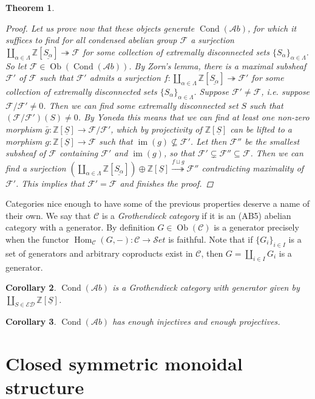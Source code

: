 \documentclass[11pt,A4]{article}
\theoremstyle{plain}
\newtheorem{thm}{Theorem}[section]
\newtheorem{cor}[thm]{Corollary}
\theoremstyle{definition}
\theoremstyle{remark}
\newcommand{\Z}{\mathbb{Z}}
\newcommand{\1}{\mathbbm{1}}
\newcommand{\F}{\mathcal{F}}
\newcommand{\scrC}{\mathscr{C}}
\newcommand{\ED}{\mathscr{ED}}
\newcommand{\Ab}{\mathscr{A}b}
\newcommand{\Set}{\mathscr{S}et}
\DeclareMathOperator{\Hom}{Hom}
\DeclareMathOperator{\Cond}{Cond}
\DeclareMathOperator{\Ob}{Ob}
\DeclareMathOperator{\im}{im}
\renewcommand{\u}[1]{\underline{#1}}
\newcommand{\op}{\oplus}
\begin{document}
\begin{thm}
\begin{proof}
	Let us prove now that these objects generate $\Cond(\Ab)$, for which it suffices to find for all condensed abelian group $\F$ a surjection $\coprod_{\alpha \in \Lambda}\Z[\u{S_{\alpha}}]\twoheadrightarrow \F$ for some collection of extremally disconnected sets $\{S_{\alpha}\}_{\alpha\in \Lambda}$.
	So let $\F\in \Ob(\Cond(\Ab))$.
	By Zorn's lemma, there is a maximal subsheaf $\F'$ of $\F$ such that $\F'$ admits a surjection $f\colon \coprod_{\alpha\in \Lambda}\Z[\u{S_{\alpha}}]\twoheadrightarrow \F'$ for some collection of extremally disconnected sets $\{S_{\alpha}\}_{\alpha\in \Lambda}$.
	Suppose $\F'\neq \F$, i.e. suppose $\F/\F'\neq 0$.
	Then we can find some extremally disconnected set $S$ such that $(\F/\F')(S)\neq 0$.
	By Yoneda this means that we can find at least one non-zero morphism $\bar{g}\colon \Z[\u{S}]\to \F/\F'$, which by projectivity of $\Z[\u{S}]$ can be lifted to a morphism $g\colon \Z[\u{S}]\to \F$ such that $\im(g)\not\subseteq \F'$.
	Let then $\F''$ be the smallest subsheaf of $\F$ containing $\F'$ and $\im(g)$, so that $\F'\subsetneq \F''\subseteq \F$.
	Then we can find a surjection $(\coprod_{\alpha\in \Lambda} \Z[\u{S_{\alpha}}])\op \Z[\u{S}]\overset{f\sqcup g}{\twoheadrightarrow} \F''$ contradicting maximality of $\F'$.
	This implies that $\F'=\F$ and finishes the proof.
    \end{proof}
\end{thm}

Categories nice enough to have some of the previous properties deserve a name of their own.
We say that $\scrC$ is a \textit{Grothendieck category} if it is an (AB5) abelian category with a generator.
By definition $G\in \Ob(\scrC)$ is a generator precisely when the functor $\Hom_{\scrC}(G,-)\colon \scrC\to \Set$ is faithful.
Note that if $\{G_{i}\}_{i\in I}$ is a set of generators and arbitrary coproducts exist in $\scrC$, then $G=\coprod_{i\in I}G_{i}$ is a generator.

\begin{cor}
    $\Cond(\Ab)$ is a Grothendieck category with generator given by $\coprod_{S\in \ED}\Z[\u{S}]$.
\end{cor}

\begin{cor}
    $\Cond(\Ab)$ has enough injectives and enough projectives.
\end{cor}

\section{Closed symmetric monoidal structure}
\end{document}
